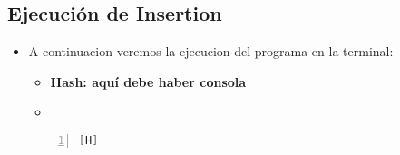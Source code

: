 \subsection{Ejecución de Insertion}
\begin{itemize}
  \item A continuacion veremos la ejecucion del programa en la terminal:
  \begin{itemize}
    \item \textbf{Hash: aquí debe haber consola}
    \item
  \end{itemize}
  \begin{lstlisting}[language=Java, caption={TITULOOOOOO}, numbers=left, firstnumber=1][H]
  \end{lstlisting}
\end{itemize}




\begin{comment}
  \begin{itemize}
    \item \textbf{Hash: aquí debe haber consola}
    \item
  \end{itemize}
  \begin{lstlisting}[language=bash,caption={Compilación y ejecución del código}][H]
  \end{lstlisting}
\end{comment}

